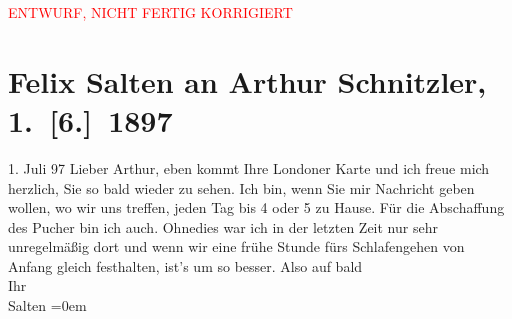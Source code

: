 
\begin{center}
            \textcolor{red}{ENTWURF, NICHT FERTIG KORRIGIERT}
                      \end{center}
            
         \renewcommand{\erwaehnteOrte}{Orte: Café Pucher, London, Wien}
         \renewcommand{\erwaehnteWerke}{}
               \section[Felix Salten an Arthur Schnitzler, 1. {[}6.{]} 1897]{ Felix Salten an Arthur Schnitzler, 1. {[}6.{]} 1897}\nopagebreak{}\rehead{ }\begin{ledgroupsized}[t]{13cm}\normalsize\beginnumbering \toendnotes[C]{\smallbreak\pagebreak[2]} 
\pstart
           {\pb}1. Juli 97\pend
           \pstart
           Lieber Arthur, eben kommt Ihre Londoner
               Karte und ich freue mich herzlich, Sie so bald wieder zu sehen. Ich bin, wenn Sie mir
               Nachricht geben wollen, wo wir uns treffen, jeden Tag bis 4 oder 5 zu Hause. Für die
               Abschaffung des Pucher bin ich auch. Ohnedies war ich in
               der letzten Zeit nur sehr unregelmäßig dort und wenn wir eine frühe Stunde fürs
               Schlafengehen von Anfang gleich festhalten, ist's um so besser. \pend
           \pstart
           Also auf bald {\\[\baselineskip]}Ihr {\\[\baselineskip]}\spacefill\mbox{Salten}\pend
           \leftskip=0em{}
         
         \endnumbering{}\end{ledgroupsized}\begin{anhang}\end{anhang}\newcommand{\dateiname}{L03267}\newcommand{\titel}{Felix Salten an Arthur Schnitzler, 1. [6.] 1897}\newcommand{\editorInnen}{Martin Anton Müller und Laura Untner}
      